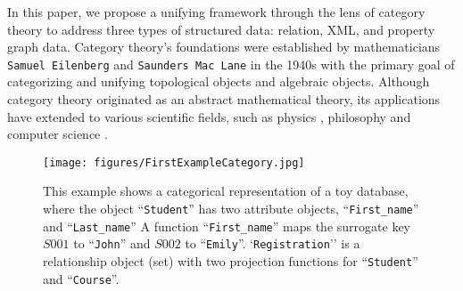 


In this paper, we propose a unifying framework through the lens of category theory to address three types of structured data: relation, XML, and property graph data. Category theory's foundations were established by mathematicians \texttt{Samuel Eilenberg} and \texttt{Saunders Mac Lane} in the 1940s with the primary goal of categorizing and unifying topological objects and algebraic objects. Although category theory originated as an abstract mathematical theory, its applications have extended to various scientific fields, such as physics \cite{coecke2006introducing,zeng2019quantum}, philosophy \cite{peruzzi2006meaning,gangle2015diagrammatic}  and computer science \cite{pierce1991basic,fiadeiro2005categories,shiebler2021category}.


\begin{figure}\centering\texttt{[image: figures/FirstExampleCategory.jpg]}
\caption{This example shows a categorical representation of a toy database, where the object ``\texttt{Student}'' has two attribute objects, ``\texttt{First\_name}'' and ``\texttt{Last\_name}'' A function ``\texttt{First\_name}'' maps the surrogate key $S001$ to ``\texttt{John}'' and $S002$ to ``\texttt{Emily}''. `\texttt{Registration}'' is a relationship object (set) with two projection functions for ``\texttt{Student}'' and ``\texttt{Course}''.} \label{fig:firstexamplecategory}
\end{figure}


